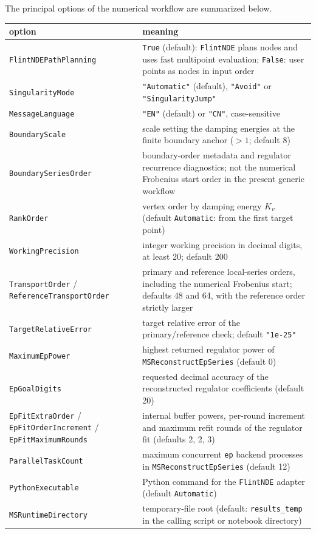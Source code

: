 \documentclass[11pt,a4paper]{article}
\begin{document}
The principal options of the numerical workflow are summarized below.
\begin{center}
\begin{tabular}{@{}p{5.0cm}p{9.3cm}@{}}
\toprule
option & meaning\\
\midrule
\texttt{FlintNDEPathPlanning} & \texttt{True} (default): \texttt{FlintNDE} plans nodes and uses fast
multipoint evaluation; \texttt{False}: user points as nodes in input order\\
\texttt{SingularityMode} & \texttt{"Automatic"} (default), \texttt{"Avoid"} or \texttt{"SingularityJump"}\\
\texttt{MessageLanguage} & \texttt{"EN"} (default) or \texttt{"CN"}, case-sensitive\\
\texttt{BoundaryScale} & scale setting the damping energies at the finite boundary anchor ($>1$; default 8)\\
\texttt{BoundarySeriesOrder} & boundary-order metadata and regulator recurrence diagnostics; not the numerical Frobenius start order in the present generic workflow\\
\texttt{RankOrder} & vertex order by damping energy $K_v$ (default \texttt{Automatic}: from the first target point)\\
\texttt{WorkingPrecision} & integer working precision in decimal digits, at least 20; default 200\\
\texttt{TransportOrder} / \texttt{ReferenceTransportOrder} & primary and reference local-series orders, including the numerical Frobenius start; defaults 48 and 64, with the reference order strictly larger\\
\texttt{TargetRelativeError} & target relative error of the primary/reference check; default \texttt{"1e-25"}\\
\texttt{MaximumEpPower} & highest returned regulator power of \texttt{MSReconstructEpSeries}
(default 0)\\
\texttt{EpGoalDigits} & requested decimal accuracy of the reconstructed regulator coefficients
(default 20)\\
\texttt{EpFitExtraOrder} / \texttt{EpFitOrderIncrement} / \texttt{EpFitMaximumRounds} & internal
buffer powers, per-round increment and maximum refit rounds of the regulator fit (defaults 2, 2, 3)\\
\texttt{ParallelTaskCount} & maximum concurrent \texttt{ep} backend processes in \texttt{MSReconstructEpSeries} (default 12)\\
\texttt{PythonExecutable} & Python command for the \texttt{FlintNDE} adapter (default \texttt{Automatic})\\
\texttt{MSRuntimeDirectory} & temporary-file root (default: \texttt{results\_temp} in the calling script or notebook directory)\\
\bottomrule
\end{tabular}
\end{center}
\end{document}
